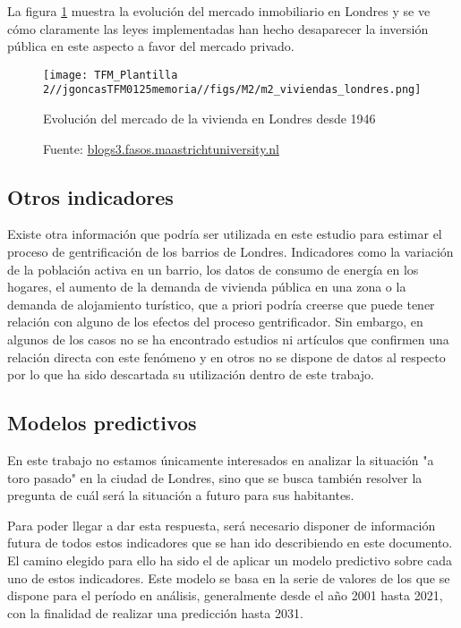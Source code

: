 \documentclass[12pt,a4paper,twoside]{book}
\begin{document}
La figura \ref{fig:fig_viviendas_londres} muestra la evolución del mercado inmobiliario en Londres y se ve cómo claramente las leyes implementadas han hecho desaparecer la inversión pública en este aspecto a favor del mercado privado.

\begin{figure}[h!]
    \centering
    \texttt{[image: TFM\_Plantilla 2//jgoncasTFM0125memoria//figs/M2/m2\_viviendas\_londres.png]}
    \caption{Evolución del mercado de la vivienda en Londres desde 1946}
    \caption*{Fuente: \href{https://blogs3.fasos.maastrichtuniversity.nl/EUS2517/diversity-and-inclusivity/2024/01/28/the-role-of-the-state-in-london-gentrification-process-and-why-you-cannot-afford-to-live-there-anymore/}{blogs3.fasos.maastrichtuniversity.nl}}
    \label{fig:fig_viviendas_londres}
\end{figure}

\subsection{Otros indicadores}

Existe otra información que podría ser utilizada en este estudio para estimar el proceso de gentrificación de los barrios de Londres. Indicadores como la variación de la población activa en un barrio, los datos de consumo de energía en los hogares, el aumento de la demanda de vivienda pública en una zona o la demanda de alojamiento turístico, que a priori podría creerse que puede tener relación con alguno de los efectos del proceso gentrificador. Sin embargo, en algunos de los casos no se ha encontrado estudios ni artículos que confirmen una relación directa con este fenómeno y en otros no se dispone de datos al respecto por lo que ha sido descartada su utilización dentro de este trabajo.

\subsection{Modelos predictivos}

En este trabajo no estamos únicamente interesados en analizar la situación "a toro pasado" en la ciudad de Londres, sino que se busca también resolver la pregunta de cuál será la situación a futuro para sus habitantes.

Para poder llegar a dar esta respuesta, será necesario disponer de información futura de todos estos indicadores que se han ido describiendo en este documento. El camino elegido para ello ha sido el de aplicar un modelo predictivo sobre cada uno de estos indicadores. Este modelo se basa en la serie de valores de los que se dispone para el período en análisis, generalmente desde el año 2001 hasta 2021, con la finalidad de realizar una predicción hasta 2031. 
\end{document}
